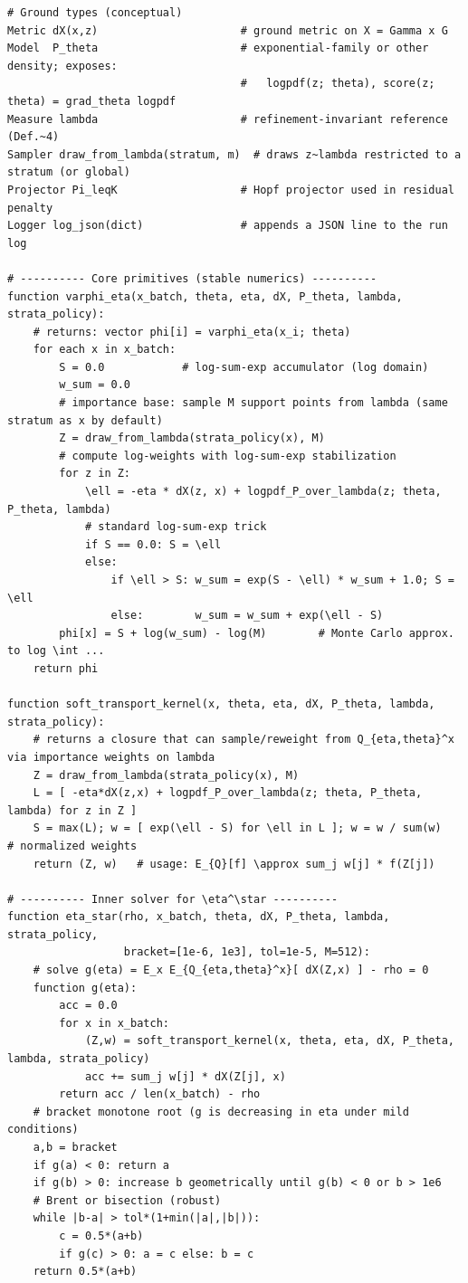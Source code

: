 \documentclass[10pt]{article}
\begin{document}
\begin{lstlisting}
# Ground types (conceptual)
Metric dX(x,z)                      # ground metric on X = Gamma x G
Model  P_theta                      # exponential-family or other density; exposes:
                                    #   logpdf(z; theta), score(z; theta) = grad_theta logpdf
Measure lambda                      # refinement-invariant reference (Def.~4)
Sampler draw_from_lambda(stratum, m)  # draws z~lambda restricted to a stratum (or global)
Projector Pi_leqK                   # Hopf projector used in residual penalty
Logger log_json(dict)               # appends a JSON line to the run log

# ---------- Core primitives (stable numerics) ----------
function varphi_eta(x_batch, theta, eta, dX, P_theta, lambda, strata_policy):
    # returns: vector phi[i] = varphi_eta(x_i; theta)
    for each x in x_batch:
        S = 0.0            # log-sum-exp accumulator (log domain)
        w_sum = 0.0
        # importance base: sample M support points from lambda (same stratum as x by default)
        Z = draw_from_lambda(strata_policy(x), M)
        # compute log-weights with log-sum-exp stabilization
        for z in Z:
            \ell = -eta * dX(z, x) + logpdf_P_over_lambda(z; theta, P_theta, lambda)
            # standard log-sum-exp trick
            if S == 0.0: S = \ell
            else:
                if \ell > S: w_sum = exp(S - \ell) * w_sum + 1.0; S = \ell
                else:        w_sum = w_sum + exp(\ell - S)
        phi[x] = S + log(w_sum) - log(M)        # Monte Carlo approx. to log \int ...
    return phi

function soft_transport_kernel(x, theta, eta, dX, P_theta, lambda, strata_policy):
    # returns a closure that can sample/reweight from Q_{eta,theta}^x via importance weights on lambda
    Z = draw_from_lambda(strata_policy(x), M)
    L = [ -eta*dX(z,x) + logpdf_P_over_lambda(z; theta, P_theta, lambda) for z in Z ]
    S = max(L); w = [ exp(\ell - S) for \ell in L ]; w = w / sum(w)   # normalized weights
    return (Z, w)   # usage: E_{Q}[f] \approx sum_j w[j] * f(Z[j])

# ---------- Inner solver for \eta^\star ----------
function eta_star(rho, x_batch, theta, dX, P_theta, lambda, strata_policy,
                  bracket=[1e-6, 1e3], tol=1e-5, M=512):
    # solve g(eta) = E_x E_{Q_{eta,theta}^x}[ dX(Z,x) ] - rho = 0
    function g(eta):
        acc = 0.0
        for x in x_batch:
            (Z,w) = soft_transport_kernel(x, theta, eta, dX, P_theta, lambda, strata_policy)
            acc += sum_j w[j] * dX(Z[j], x)
        return acc / len(x_batch) - rho
    # bracket monotone root (g is decreasing in eta under mild conditions)
    a,b = bracket
    if g(a) < 0: return a
    if g(b) > 0: increase b geometrically until g(b) < 0 or b > 1e6
    # Brent or bisection (robust)
    while |b-a| > tol*(1+min(|a|,|b|)):
        c = 0.5*(a+b)
        if g(c) > 0: a = c else: b = c
    return 0.5*(a+b)


\end{lstlisting}
\end{document}
